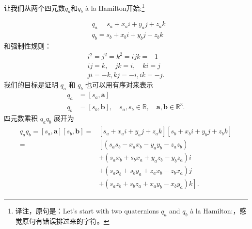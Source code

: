 让我们从两个四元数$q_{a}$和$q_{b}$ à la Hamilton开始:\footnote{译注，原句是：Let's start with two quaternions $q_{a}$ and $q_{b}$ à la Hamilton:，感觉原句有错误排过来的字符。 }

$$
    \begin{aligned}
         & q_{a}=s_{a}+x_{a} i+y_{a} j+z_{a} k \\
         & q_{b}=s_{b}+x_{b} i+y_{b} j+z_{b} k
    \end{aligned}
$$
和强制性规则：
$$
    \begin{gathered}
        i^{2}=j^{2}=k^{2}=i j k=-1 \\
        i j=k, \quad j k=i, \quad k i=j \\
        j i=-k, k j=-i, i k=-j .
    \end{gathered}
$$
我们的目标是证明 $q_{a}$ 和 $q_{b}$ 也可以用有序对来表示
$$
    \begin{aligned}
        q_{a} & =\left[s_{a}, \mathbf{a}\right]                                                                                       \\
        q_{b} & =\left[s_{b}, \mathbf{b}\right], \quad s_{a}, s_{b} \in \mathbb{R}, \quad \mathbf{a}, \mathbf{b} \in \mathbb{R}^{3} .
    \end{aligned}
$$
四元数乘积 $q_{a} q_{b}$ 展开为
\begin{align}
    \begin{aligned}
        q_{a} q_{b}=\left[s_{a}, \mathbf{a}\right]\left[s_{b}, \mathbf{b}\right]= & {\left[s_{a}+x_{a} i+y_{a} j+z_{a} k\right]\left[s_{b}+x_{b} i+y_{b} j+z_{b} k\right] } \\
        =                                                                         & {\left[\left(s_{a} s_{b}-x_{a} x_{b}-y_{a} y_{b}-z_{a} z_{b}\right)\right.}             \\
                                                                                  & +\left(s_{a} x_{b}+s_{b} x_{a}+y_{a} z_{b}-y_{b} z_{a}\right) i                         \\
                                                                                  & +\left(s_{a} y_{b}+s_{b} y_{a}+z_{a} x_{b}-z_{b} x_{a}\right) j                         \\
                                                                                  & \left.+\left(s_{a} z_{b}+s_{b} z_{a}+x_{a} y_{b}-x_{b} y_{a}\right) k\right] .
    \end{aligned}
    \label{ep:6.4}
\end{align}

